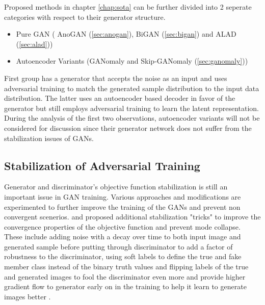 Proposed methods in chapter \ref{chap:sota} can be further divided into 2 seperate categories with
respect to their generator structure. 
\begin{itemize}
	\item Pure GAN ( AnoGAN (\ref{sec:anogan}), BiGAN (\ref{sec:bigan}) and ALAD (\ref{sec:alad}))
	\item Autoencoder Variants (GANomaly and Skip-GANomaly (\ref{sec:ganomaly}))
\end{itemize}

First group has a generator that accepts the noise as an input and uses adversarial training to
match the generated sample distribution to the input data distribution. The latter uses an
autoencoder based decoder in favor of the generator but still employs adversarial training to learn
the latent representation. During the analysis of the first two observations, autoencoder variants
will not be considered for discussion since their generator network does not suffer from the
stabilization issues of GANs.

\subsection{Stabilization of Adversarial Training}

Generator and discriminator's objective function stabilization is still an important issue in GAN
training. Various approaches and modifications are experimented to further improve the training of
the GANs and prevent non convergent scenerios. \cite{methods} and \cite{fm} proposed additional
stabilization "tricks" to improve the convergence properties of the objective function and prevent
mode collapse. These include adding noise with a decay over time to both input image and generated
sample before putting through discriminator to add a factor of robustness to the discriminator,
using soft labels to define the true and fake member class instead of the binary truth values and
flipping labels of the true and generated images to fool the discriminator even more and provide
higher gradient flow to generator early on in the training to help it learn to generate images
better \cite{fm}.

